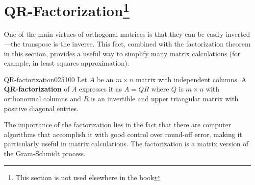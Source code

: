 \section[QR-Factorization]{QR-Factorization\footnote{This section is not used elsewhere in the book}}
\label{sec:8_4}

One of the main virtues of orthogonal 
matrices is that they can be easily inverted---the transpose is the 
inverse. This fact, combined with the factorization theorem in this 
section, provides a useful way to simplify many matrix calculations (for
 example, in least squares approximation).


\begin{definition}{QR-factorization}{025100}
Let $A$ be an $m \times n$ matrix with independent columns. A \textbf{QR-factorization} of $A$ expresses it as $A = QR$ where $Q$ is $m \times n$ with orthonormal columns and $R$ is an invertible and upper triangular matrix with positive diagonal entries.
\end{definition}

\noindent The importance of the factorization 
lies in the fact that there are computer algorithms that accomplish it 
with good control over round-off error, making it particularly useful in
 matrix calculations. The factorization is a matrix version of the 
Gram-Schmidt process.


